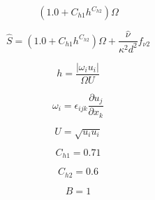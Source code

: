 

\begin{equation}
(1.0+C_{h1}h^{C_{h2}})\Omega
\end{equation}

\begin{equation}
\hat S=\left(1.0+C_{h1}h^{C_{h2}}\right)\Omega+\frac{\hat \nu}{\kappa^2 d^2}f_{\nu2}
\end{equation}

\begin{equation}
h=\frac{\vert\omega_{i}u_{i}\vert}{\Omega U}
\end{equation}

\begin{equation}
\omega_{i}=\epsilon_{ijk}\frac{\partial u_{j}}{\partial x_{k}}
\end{equation}

\begin{equation}
U=\sqrt{u_{i}u_{i}}
\end{equation}

\begin{equation}
C_{h1}=0.71
\end{equation}

\begin{equation}
C_{h2}=0.6
\end{equation}

\begin{equation}
B=1
\end{equation}


